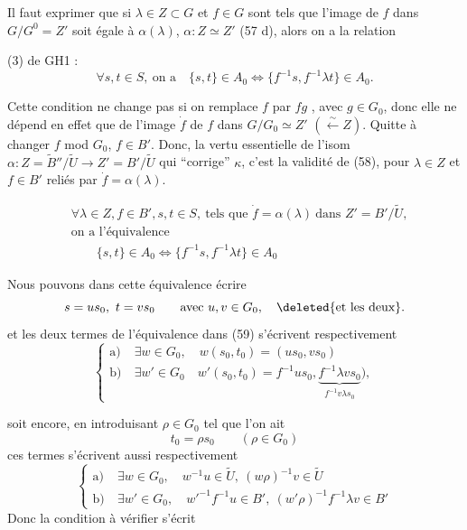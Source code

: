 Il faut exprimer que si $\lambda\in Z\subset G$ et $f\in G$ sont tels que l'image de $f$ dans $G/G^0=Z'$ soit  égale à $\alpha(\lambda)$,  $\alpha:Z\simeq Z'$ (57 d), alors on a la relation

(3) de GH1 :
\[
\forall s,t\in S,\ \text{on a}\quad\{s,t\}\in A_0\Longleftrightarrow\{f^{-1}s,f^{-1}\lambda t\}\in A_0. \tag*{(58)}
\]

 Cette condition ne change pas si on  remplace $f$ par $fg$ , avec $g\in G_0$, donc elle ne dépend en effet que de l'image $\dot f$ de $f$ dans $G/G_0\simeq Z'$ $(\overset{\sim}{\leftarrow} Z)$. Quitte à changer $f$ mod $G_0$,  $f\in B'$. Donc, la vertu essentielle de l'isom $\alpha:Z=\widetilde B''/\widetilde U\longrightarrow Z'=B'/\widetilde U$ qui ``corrige'' $\kappa$, c'est la validité de (58), pour  $\lambda\in Z$ et $f\in B'$ reliés par $\dot f=\alpha(\lambda)$.

\[
\begin{aligned}
&\forall\lambda\in Z,f\in B',s,t\in S,\ \text{tels que }\dot f=\alpha(\lambda)\ \text{dans }Z'=B'/\widetilde U,\\
&\text{on a l'équivalence}\\
&\qquad \{s,t\}\in A_0\Longleftrightarrow\{f^{-1}s,f^{-1}\lambda t\}\in A_0
\end{aligned}\tag*{(59)}
\]

Nous pouvons dans cette équivalence écrire
\[
s=us_0,\ t=vs_0\qquad\text{avec }u,v\in G_0,\quad\deleted{\text{et les deux}}.
\]
et les deux termes de l'équivalence dans (59) s'écrivent respectivement
\[
\left\{\begin{aligned}
\text{a)}\ &\exists w\in G_0,\quad w(s_0,t_0)=(us_0,vs_0)\\
\text{b)}\ &\exists w'\in G_0\quad w'(s_0,t_0)= f^{-1}us_0,\underbrace{f^{-1}\lambda vs_0}_{f^{-1}v\lambda s_0}\bigr),
\end{aligned}\right. \tag*{(60)}
\]

soit encore, en introduisant $\rho\in G_0$ tel que l'on ait
\[
t_0=\rho s_0\qquad(\rho\in G_0) \tag*{(61)}
\]
ces termes s'écrivent aussi respectivement
\[
\left\{\begin{aligned}
\text{a)}\ &\exists w\in G_0,\quad w^{-1}u\in\widetilde U,\ (w\rho)^{-1}v\in\widetilde U\\
\text{b)}\ &\exists w'\in G_0,\quad w'^{-1}f^{-1}u\in B',\ (w'\rho)^{-1}f^{-1}\lambda v\in B'
\end{aligned}\right. \tag*{(62)}
\]
Donc la condition à vérifier s'écrit

